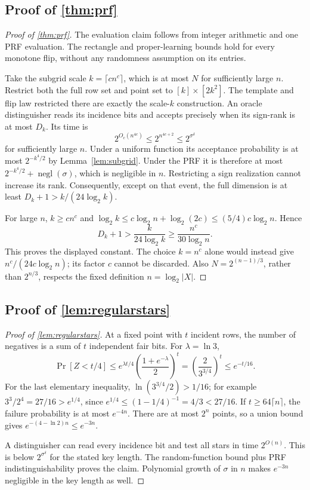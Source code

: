 \subsection[Proof of result prf]{Proof of \cref{thm:prf}}\label{proof:prf}
\begin{proof}[Proof of \cref{thm:prf}]
The evaluation claim follows from integer arithmetic and one PRF evaluation. The rectangle and proper-learning bounds hold for every monotone flip, without any randomness assumption on its entries.

Take the subgrid scale $k=\lceil c n^c\rceil$, which is at most $N$ for sufficiently large $n$. Restrict both the full row set and point set to $[k]\times[2k^2]$. The template and flip law restricted there are exactly the scale-$k$ construction. An oracle distinguisher reads its incidence bits and accepts precisely when its sign-rank is at most $D_k$. Its time is
\[
 2^{O_c(n^{4c})}\le2^{n^{4c+2}}\le2^{\sigma^\delta}
\]
for sufficiently large $n$. Under a uniform function its acceptance probability is at most $2^{-k^4/2}$ by Lemma~\ref{lem:subgrid}. Under the PRF it is therefore at most $2^{-k^4/2}+\operatorname{negl}(\sigma)$, which is negligible in $n$. Restricting a sign realization cannot increase its rank. Consequently, except on that event, the full dimension is at least $D_k+1>k/(24\log_2k)$.

For large $n$, $k\ge c n^c$ and $\log_2k\le c\log_2n+\log_2(2c)\le(5/4)c\log_2n$. Hence
\[
 D_k+1>\frac{k}{24\log_2k}\ge\frac{n^c}{30\log_2n}.
\]
This proves the displayed constant. The choice $k=n^c$ alone would instead give $n^c/(24c\log_2n)$; its factor $c$ cannot be discarded. Also $N=2^{(n-1)/3}$, rather than $2^{n/3}$, respects the fixed definition $n=\log_2|X|$.
\end{proof}

\subsection[Proof of result regularstars]{Proof of \cref{lem:regularstars}}\label{proof:regularstars}
\begin{proof}[Proof of \cref{lem:regularstars}]
At a fixed point with $t$ incident rows, the number of negatives is a sum of $t$ independent fair bits. For $\lambda=\ln3$,
\[
 \Pr[Z<t/4]\le e^{\lambda t/4}\left(\frac{1+e^{-\lambda}}2\right)^t
 =\left(\frac{2}{3^{3/4}}\right)^t\le e^{-t/16}.
\]
For the last elementary inequality, $\ln(3^{3/4}/2)>1/16$; for example $3^3/2^4=27/16>e^{1/4}$, since $e^{1/4}\le(1-1/4)^{-1}=4/3<27/16$. If $t\ge64\lceil n\rceil$, the failure probability is at most $e^{-4n}$. There are at most $2^n$ points, so a union bound gives $e^{-(4-\ln2)n}\le e^{-3n}$.

A distinguisher can read every incidence bit and test all stars in time $2^{O(n)}$. This is below $2^{\sigma^\delta}$ for the stated key length. The random-function bound plus PRF indistinguishability proves the claim. Polynomial growth of $\sigma$ in $n$ makes $e^{-3n}$ negligible in the key length as well.
\end{proof}

